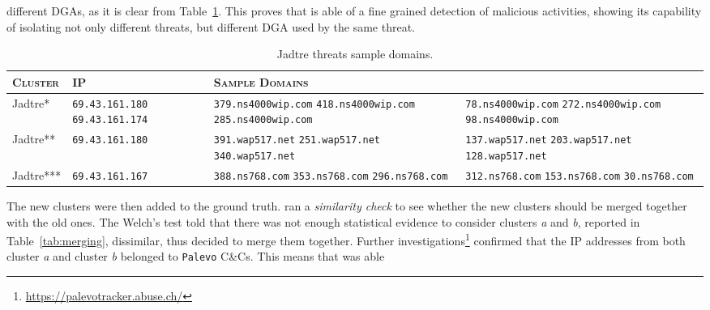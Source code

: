 different DGAs, as it is clear from Table~\ref{tab:jadtre}. This proves that
\thesystem is able of a fine grained detection of malicious activities, showing
its capability of isolating not only different threats, but different DGA used
by the same threat.
\begin{table}
\centering
\begin{tabular}{lp{2.8cm}p{3.3cm}p{3.3cm}}
\toprule
\textsc{Cluster} & \textsc{IP} & \multicolumn{2}{l}{\textsc{Sample Domains}} \\
\midrule
Jadtre*   & \texttt{69.43.161.180} \newline \texttt{69.43.161.174} &
\texttt{379.ns4000wip.com} \newline \texttt{418.ns4000wip.com} \newline \texttt{285.ns4000wip.com} &
\texttt{78.ns4000wip.com} \newline \texttt{272.ns4000wip.com} \newline \texttt{98.ns4000wip.com}\\
Jadtre**  & \texttt{69.43.161.180} & \texttt{391.wap517.net} \newline \texttt{251.wap517.net} \newline
\texttt{340.wap517.net} & \texttt{137.wap517.net} \newline \texttt{203.wap517.net} \newline \texttt{128.wap517.net}
\\
Jadtre*** & \texttt{69.43.161.167} &
\texttt{388.ns768.com} \newline \texttt{353.ns768.com} \newline \texttt{296.ns768.com} & \texttt{312.ns768.com} \newline \texttt{153.ns768.com} \newline \texttt{30.ns768.com} \\
\bottomrule
\end{tabular}
\caption{Jadtre threats sample domains.}
\label{tab:jadtre}
\end{table}
The new clusters were then added to the ground truth. \thesystem ran a
\emph{similarity check} to see whether the new clusters should be
merged together with the old ones. The Welch's test told that
there was not enough statistical evidence to consider
clusters \emph{a} and \emph{b}, reported in Table~\ref{tab:merging},
dissimilar, thus \thesystem decided to merge
them together. Further investigations\footnote{\url{https://palevotracker.abuse.ch/}} confirmed that the IP addresses from both cluster \emph{a} and cluster \emph{b} belonged to \texttt{Palevo} C\&Cs. This means that \thesystem was able
